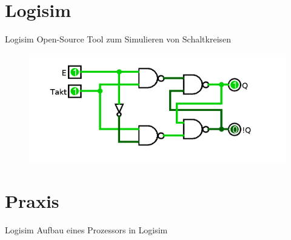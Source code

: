 \documentclass[handout]{beamer}
\begin{document}
\section{Logisim}
\begin{frame}[t]{Logisim}
Open-Source Tool zum Simulieren von Schaltkreisen
\begin{figure}[!htb]
\centering
\includegraphics[scale=0.30]{flipflop}
\end{figure}
\end{frame}


\section{Praxis}
\begin{frame}{Logisim}
Aufbau eines Prozessors in Logisim
\end{frame}
\end{document}
